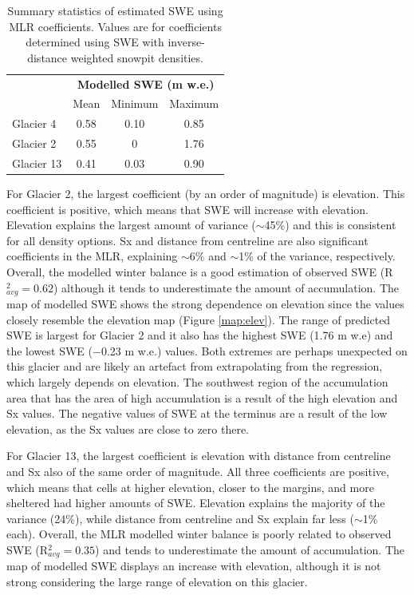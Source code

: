 \documentclass[12pt]{article}
\begin{document}
\begin{table}
\centering
\caption{Summary statistics of estimated SWE using MLR coefficients. Values are for coefficients determined using SWE with inverse-distance weighted snowpit densities. }
\label{tab:MLRsweMinMax}
\begin{tabular}{lccc}
\multicolumn{1}{l}{} & \multicolumn{3}{c}{\textbf{Modelled SWE (m w.e.)}} \\
                     & Mean          & Minimum          & Maximum         \\ \hline
Glacier 4            & 0.58          & 0.10             & 0.85            \\
Glacier 2            & 0.55          & 0            & 1.76            \\
Glacier 13           & 0.41          & 0.03             & 0.90           
\end{tabular}
\end{table} 

For Glacier 2, the largest coefficient (by an order of magnitude) is elevation. This coefficient is positive, which means that SWE will increase with elevation. Elevation explains the largest amount of variance ($\sim$45\%) and this is consistent for all density options. Sx and distance from centreline are also significant coefficients in the MLR, explaining $\sim$6\% and $\sim$1\% of the variance, respectively.  Overall, the modelled winter balance is a good estimation of observed SWE (R$^2_{avg}=0.62$) although it tends to underestimate the amount of accumulation. The map of modelled SWE shows the strong dependence on elevation since the values closely resemble the elevation map (Figure \ref{map:elev}). The range of predicted SWE is largest for Glacier 2 and it also has the highest SWE (1.76 m w.e) and the lowest SWE ($-$0.23 m w.e.) values. Both extremes are perhaps unexpected on this glacier and are likely an artefact from extrapolating from the regression, which largely depends on elevation. The southwest region of the accumulation area that has the area of high accumulation is a result of the high elevation and Sx values. The negative values of SWE at the terminus are a result of the low elevation, as the Sx values are close to zero there. 

For Glacier 13, the largest coefficient is elevation with distance from centreline and Sx also of the same order of magnitude. All three coefficients are positive, which means that cells at higher elevation, closer to the margins, and more sheltered had higher amounts of SWE. Elevation explains the majority of the variance (24\%), while distance from centreline and Sx explain far less ($\sim$1\% each).  Overall, the MLR modelled winter balance is poorly related to observed SWE (R$^2_{avg}=0.35$) and tends to underestimate the amount of accumulation. The map of modelled SWE displays an increase with elevation, although it is not strong considering the large range of elevation on this glacier.
\end{document}
